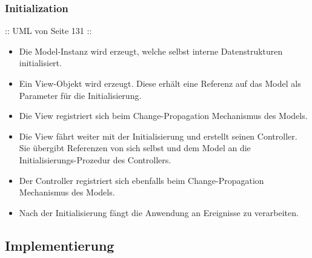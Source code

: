 \subsubsection*{Initialization}


:: UML von Seite 131 ::

\begin{itemize}
	\item Die Model-Instanz wird erzeugt, welche selbst interne Datenstrukturen initialisiert.
	\item Ein View-Objekt wird erzeugt. Diese erhält eine Referenz auf das Model als Parameter für die Initialisierung.
	\item Die View registriert sich beim Change-Propagation Mechanismus des Models.
	\item Die View fährt weiter mit der Initialisierung und erstellt seinen Controller. Sie übergibt Referenzen von sich selbst und dem Model an die Initialisierungs-Prozedur des Controllers.
	\item Der Controller registriert sich ebenfalls beim Change-Propagation Mechanismus des Models.
	\item Nach der Initialisierung fängt die Anwendung an Ereignisse zu verarbeiten.
\end{itemize}


\subsection*{Implementierung}


